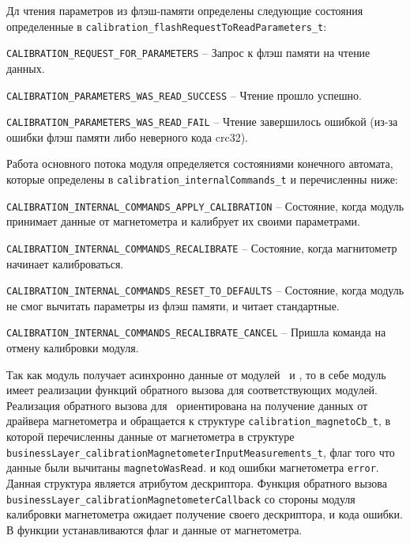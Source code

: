 Дл чтения параметров из флэш-памяти определены следующие состояния определенные в \lstinline{calibration_flashRequestToReadParameters_t}:

\begin{enumerate_num}
    \item \lstinline{CALIBRATION_REQUEST_FOR_PARAMETERS} -- Запрос к флэш памяти на чтение данных.
    \item \lstinline{CALIBRATION_PARAMETERS_WAS_READ_SUCCESS} -- Чтение прошло успешно.
    \item \lstinline{CALIBRATION_PARAMETERS_WAS_READ_FAIL} -- Чтение завершилось ошибкой (из-за ошибки флэш памяти либо неверного кода crc32).
\end{enumerate_num}

Работа основного потока модуля определяется состояниями конечного автомата, которые определены в \lstinline{calibration_internalCommands_t} и перечисленны ниже:

\begin{enumerate_num}
    \item \lstinline{CALIBRATION_INTERNAL_COMMANDS_APPLY_CALIBRATION} -- Состояние, когда модуль принимает данные от магнетометра и калибрует их своими параметрами.
    \item \lstinline{CALIBRATION_INTERNAL_COMMANDS_RECALIBRATE} -- Состояние, когда магнитометр начинает калиброваться.
    \item \lstinline{CALIBRATION_INTERNAL_COMMANDS_RESET_TO_DEFAULTS} -- Состояние, когда модуль не смог вычитать параметры из флэш памяти, и читает стандартные.
    \item \lstinline{CALIBRATION_INTERNAL_COMMANDS_RECALIBRATE_CANCEL} -- Пришла команда на отмену калибровки модуля.
\end{enumerate_num}

Так как модуль получает асинхронно данные от модулей \modulePerifery~и \moduleFlashMemory , то в себе модуль имеет реализации функций обратного вызова для соответствующих модулей.
Реализация обратного вызова для \modulePerifery~ориентирована на получение данных от драйвера магнетометра и обращается к структуре \lstinline{calibration_magnetoCb_t},
в которой перечисленны данные от магнетометра в структуре \lstinline{businessLayer_calibrationMagnetometerInputMeasurements_t}, флаг того что данные были вычитаны \lstinline{magnetoWasRead}.
и код ошибки магнетометра \lstinline{error}. Данная структура является атрибутом дескриптора. Функция обратного вызова \lstinline{businessLayer_calibrationMagnetometerCallback} 
со стороны модуля калибровки магнетометра ожидает получение своего дескриптора, и кода ошибки. В функции устанавливаются флаг и данные от магнетометра.


